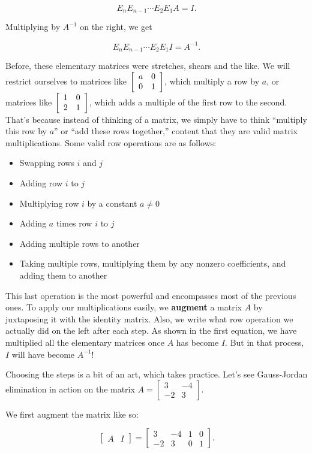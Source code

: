 \documentclass[../gatm.tex]{subfiles}
\begin{document}
$$E_nE_{n-1}\cdots E_2E_1A=I.$$

\noindent Multiplying by $A^{-1}$ on the right, we get

$$E_nE_{n-1}\cdots E_2E_1I=A^{-1}.$$

\noindent Before, these elementary matrices were stretches, shears and the like. We will restrict ourselves to matrices like $\left[\begin{array}{cc} a & 0 \\ 0 & 1 \end{array}\right]$, which multiply a row by $a$, or matrices like $\left[\begin{array}{cc} 1 & 0 \\ 2 & 1 \end{array}\right]$, which adds a multiple of the first row to the second. That's because instead of thinking of a matrix, we simply have to think ``multiply this row by $a$'' or ``add these rows together,'' content that they are valid matrix multiplications. Some valid row operations are as follows:

\begin{multicols}{2}\raggedcolumns
\begin{itemize}
\item Swapping rows $i$ and $j$
\item Adding row $i$ to $j$
\item Multiplying row $i$ by a constant $a\neq 0$
\item Adding $a$ times row $i$ to $j$
\item Adding multiple rows to another
\item Taking multiple rows, multiplying them by any nonzero coefficients, and adding them to another
\end{itemize}
\end{multicols}

\noindent This last operation is the most powerful and encompasses most of the previous ones. To apply our multiplications easily, we \textbf{augment} a matrix $A$ by juxtaposing it with the identity matrix. Also, we write what row operation we actually did on the left after each step. As shown in the first equation, we have multiplied all the elementary matrices once $A$ has become $I$. But in that process, $I$ will have become $A^{-1}$!

Choosing the steps is a bit of an art, which takes practice. Let's see Gauss-Jordan elimination in action on the matrix $A=\left[\begin{array}{cc}3 & -4 \\ -2 & 3\end{array}\right]$.

We first augment the matrix like so:

$$\left[\begin{array}{c|c}A & I \end{array}\right] = \left[\begin{array}{cc|cc} 3 & -4 & 1 & 0 \\ -2 & 3 & 0 & 1 \end{array}\right].$$
\end{document}

